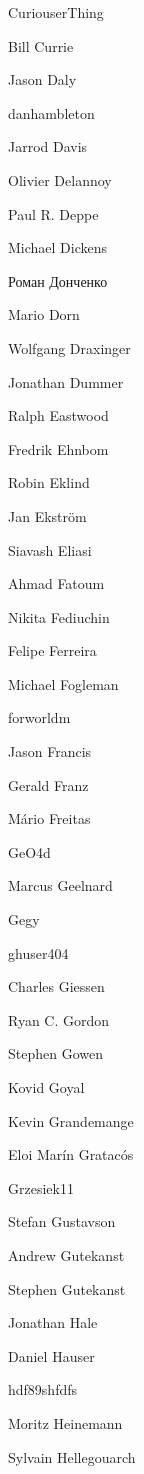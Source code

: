 \begin{DoxyItemize}
\item Curiouser\+Thing
\item Bill Currie
\item Jason Daly
\item danhambleton
\item Jarrod Davis
\item Olivier Delannoy
\item Paul R. Deppe
\item Michael Dickens
\item Роман Донченко
\item Mario Dorn
\item Wolfgang Draxinger
\item Jonathan Dummer
\item Ralph Eastwood
\item Fredrik Ehnbom
\item Robin Eklind
\item Jan Ekström
\item Siavash Eliasi
\item Ahmad Fatoum
\item Nikita Fediuchin
\item Felipe Ferreira
\item Michael Fogleman
\item forworldm
\item Jason Francis
\item Gerald Franz
\item Mário Freitas
\item Ge\+O4d
\item Marcus Geelnard
\item Gegy
\item ghuser404
\item Charles Giessen
\item Ryan C. Gordon
\item Stephen Gowen
\item Kovid Goyal
\item Kevin Grandemange
\item Eloi Marín Gratacós
\item Grzesiek11
\item Stefan Gustavson
\item Andrew Gutekanst
\item Stephen Gutekanst
\item Jonathan Hale
\item Daniel Hauser
\item hdf89shfdfs
\item Moritz Heinemann
\item Sylvain Hellegouarch

\end{DoxyItemize}
